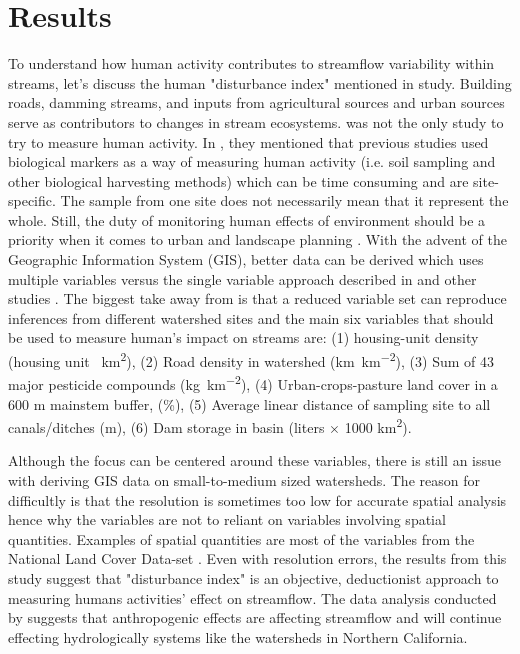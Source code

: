 \documentclass[a4paper,man,biblatex]{apa7}
\begin{document}
\section{Results}
\par To understand how human activity contributes to streamflow variability within streams, let's discuss the human "disturbance index" mentioned in \textcite{falcone_2016} study. Building roads, damming streams, and inputs from agricultural sources and urban sources serve as contributors to changes in stream ecosystems. \textcite{falcone_2016} was not the only study to try to measure human activity. In \textcite{stein_2002}, they mentioned that previous studies used biological markers as a way of measuring human activity (i.e. soil sampling and other biological harvesting methods) which can be time consuming and are site-specific. The sample from one site does not necessarily mean that it represent the whole. Still, the duty of monitoring human effects of environment should be a priority when it comes to urban and landscape planning \autocite{stein_2002}. With the advent of the Geographic Information System (GIS), better data can be derived which uses multiple variables versus the single variable approach described in \textcite{stein_2002} and other studies \autocite{falcone_2016}. The biggest take away from \textcite{falcone_2016} is that a reduced variable set can reproduce inferences from different watershed sites and the main six variables that should be used to measure human's impact on streams are: (1) housing-unit density (housing unit \si{\per\square\kilo\meter}), (2) Road density in watershed (\si{\kilo\meter\per\square\kilo\meter}), (3) Sum of 43 major pesticide compounds (\si{\kilo\gram\per\square\kilo\meter}), (4) Urban-crops-pasture land cover in a 600 m mainstem buffer, (\%), (5) Average linear distance of sampling site to all canals/ditches (m), (6) Dam storage in basin (liters $\times$ 1000 \si{\square\kilo\meter}). 
\par Although the focus can be centered around these variables, there is still an issue with deriving GIS data on small-to-medium sized watersheds. The reason for difficultly is that the resolution is sometimes too low for accurate spatial analysis hence why the variables are not to reliant on variables involving spatial quantities. Examples of spatial quantities are most of the variables from the National Land Cover Data-set \autocite{falcone_2016}. Even with resolution errors, the results from this study suggest that "disturbance index" is an objective, deductionist approach to measuring humans activities' effect on streamflow. The data analysis conducted by \textcite{mallakpour_2018} suggests that anthropogenic effects are affecting streamflow  and will continue effecting hydrologically systems like the watersheds in Northern California.\\
\end{document}
